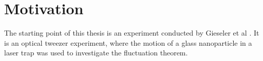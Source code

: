 \documentclass[12pt]{article}
\begin{document}





\newpage
\section{Motivation}
The starting point of this thesis is an experiment conducted by Gieseler et al \cite{Gieseler2014}. It is an optical tweezer experiment, where the
motion of a glass nanoparticle in a laser trap was used to investigate the fluctuation theorem\cite{Crooks1999}.
\end{document}
